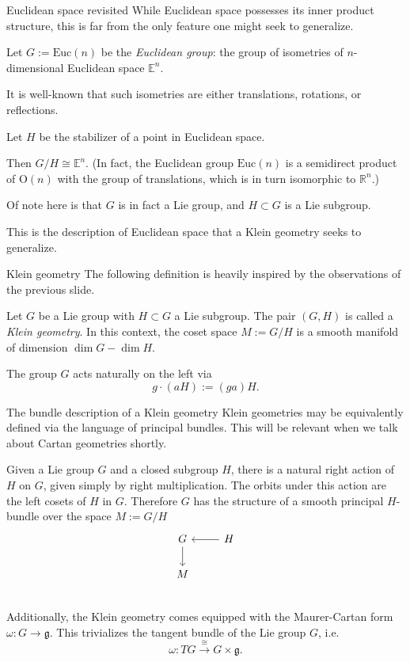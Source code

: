 \documentclass[handout]{beamer}
\newcommand{\RR}{\mathbb{R}}
\newcommand{\EE}{\mathbb{E}}
\begin{document}
\begin{frame}{Euclidean space revisited}
  While Euclidean space possesses its inner product structure, this is far from the only feature one might seek to generalize.

  Let $G:=\mathrm{Euc}(n)$ be the \emph{Euclidean group}: the group of isometries of $n$-dimensional Euclidean space $\EE^n$.

  It is well-known that such isometries are either translations, rotations, or reflections.

  Let $H$ be the stabilizer of a point in Euclidean space. 

  Then $G/H \cong \EE^n$. (In fact, the Euclidean group $\mathrm{Euc}(n)$ is a semidirect product of $\mathrm{O}(n)$ with the group of translations, which is in turn isomorphic to $\RR^n$.)
  
  Of note here is that $G$ is in fact a Lie group, and $H\subset G$ is a Lie subgroup.

  This is the description of Euclidean space that a Klein geometry seeks to generalize.
\end{frame}

\begin{frame}{Klein geometry}
  The following definition is heavily inspired by the observations of the previous slide.
  \begin{definition}
    Let $G$ be a Lie group with $H \subset G$ a Lie subgroup. 
    The pair $(G,H)$ is called a \emph{Klein geometry}.
    In this context, the coset space $M:=G/H$ is a smooth manifold of dimension $\dim G - \dim H$.
  \end{definition}
  The group $G$ acts naturally on the left via 
  \[
    g \cdot (aH) := (ga)H.
  \]
\end{frame}

\begin{frame}{The bundle description of a Klein geometry}
  Klein geometries may be equivalently defined via the language of principal bundles. 
  This will be relevant when we talk about Cartan geometries shortly. 

  Given a Lie group $G$ and a closed subgroup $H$, there is a natural right action of $H$ on $G$, given simply by right multiplication. 
  The orbits under this action are the left cosets of $H$ in $G$. 
  Therefore $G$ has the structure of a smooth principal $H$-bundle over the space $M:=G/H$
  \[
    \begin{tikzcd}[ampersand replacement=\&]
      G  \arrow[d] \& H \arrow[l]\\
      M \& {} \\
    \end{tikzcd}
  \]
  Additionally, the Klein geometry comes equipped with the Maurer-Cartan form $\omega : G \to \mathfrak{g}$.
  This trivializes the tangent bundle of the Lie group $G$, i.e. 
  \[
    \omega : TG \overset{\cong}{\longrightarrow} G \times \mathfrak{g}.
  \]
\end{frame}
\end{document}
